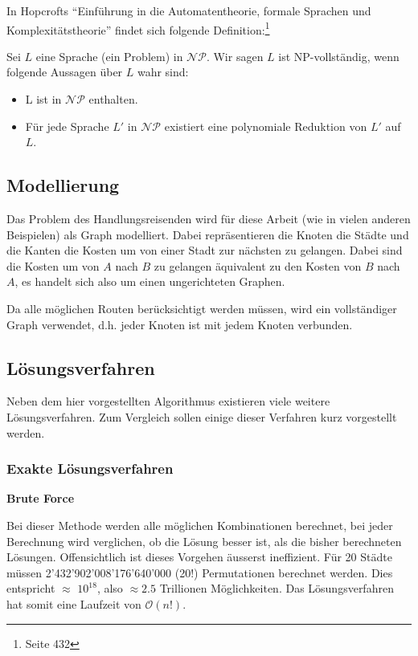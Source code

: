 \documentclass[11pt,a4paper]{article}
\begin{document}
\medskip

In Hopcrofts "`Einführung in die Automatentheorie, formale Sprachen und Komplexitätstheorie"' findet sich folgende Definition:\footnote{\cite{hopcroft02} Seite 432}

Sei $L$ eine Sprache (ein Problem) in $\mathcal{NP}$. Wir sagen $L$ ist NP-vollständig, wenn folgende Aussagen über $L$ wahr sind:
\begin{itemize}
    \item L ist in $\mathcal{NP}$ enthalten.
    \item Für jede Sprache $L'$ in $\mathcal{NP}$ existiert eine polynomiale Reduktion von $L'$ auf $L$.
\end{itemize}


\subsection{Modellierung}
Das Problem des Handlungsreisenden wird für diese Arbeit (wie in vielen anderen Beispielen) als Graph modelliert. Dabei repräsentieren die Knoten die Städte und die Kanten die Kosten um von einer Stadt zur nächsten zu gelangen. Dabei sind die Kosten um von $A$ nach $B$ zu gelangen äquivalent zu den Kosten von $B$ nach $A$, es handelt sich also um einen ungerichteten Graphen.

Da alle möglichen Routen berücksichtigt werden müssen, wird ein vollständiger Graph verwendet, d.h. jeder Knoten ist mit jedem Knoten verbunden.

\subsection{Lösungsverfahren}
Neben dem hier vorgestellten Algorithmus existieren viele weitere Lösungsverfahren. Zum Vergleich sollen einige dieser Verfahren kurz vorgestellt werden.

\subsubsection{Exakte Lösungsverfahren}
\begin{flushleft}
\textbf{Brute Force}

Bei dieser Methode werden alle möglichen Kombinationen berechnet, bei jeder Berechnung wird verglichen, ob die Lösung besser ist, als die bisher berechneten Lösungen. Offensichtlich ist dieses Vorgehen äusserst ineffizient. Für 20 Städte müssen 2'432'902'008'176'640'000 (20!) Permutationen berechnet werden. Dies entspricht $\approx$ $10^{18}$, also $\approx2.5$ Trillionen Möglichkeiten. Das Lösungsverfahren hat somit eine Laufzeit von $\mathcal O(n!)$.

\end{flushleft}
\end{document}
